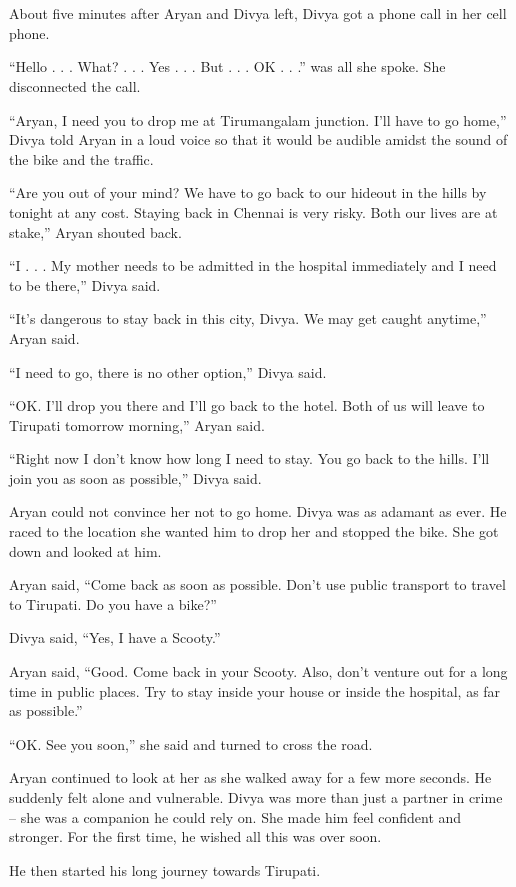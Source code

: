\chapter{}

About five minutes after Aryan and Divya left, Divya got a phone call in her
cell phone.

“Hello . . . What? . . . Yes . . . But . . . OK . . .” was all she spoke. She
disconnected the call.

“Aryan, I need you to drop me at Tirumangalam junction. I'll have to go home,”
Divya told Aryan in a loud voice so that it would be audible amidst the sound of
the bike and the traffic.

“Are you out of your mind? We have to go back to our hideout in the hills by
tonight at any cost. Staying back in Chennai is very risky. Both our lives are
at stake,” Aryan shouted back.

“I . . . My mother needs to be admitted in the hospital immediately and I need
to be there,” Divya said.

“It's dangerous to stay back in this city, Divya. We may get caught anytime,”
Aryan said.

“I need to go, there is no other option,” Divya said.

“OK. I'll drop you there and I'll go back to the hotel. Both of us will leave to
Tirupati tomorrow morning,” Aryan said.

“Right now I don't know how long I need to stay. You go back to the hills. I'll
join you as soon as possible,” Divya said.

Aryan could not convince her not to go home. Divya was as adamant as ever. He
raced to the location she wanted him to drop her and stopped the bike. She got
down and looked at him.

Aryan said, “Come back as soon as possible. Don't use public transport to travel
to Tirupati. Do you have a bike?”

Divya said, “Yes, I have a Scooty.”

Aryan said, “Good. Come back in your Scooty. Also, don't venture out for a long
time in public places. Try to stay inside your house or inside the hospital, as
far as possible.”

“OK. See you soon,” she said and turned to cross the road.

Aryan continued to look at her as she walked away for a few more seconds. He
suddenly felt alone and vulnerable. Divya was more than just a partner in crime
– she was a companion he could rely on. She made him feel confident and
stronger. For the first time, he wished all this was over soon.

He then started his long journey towards Tirupati.